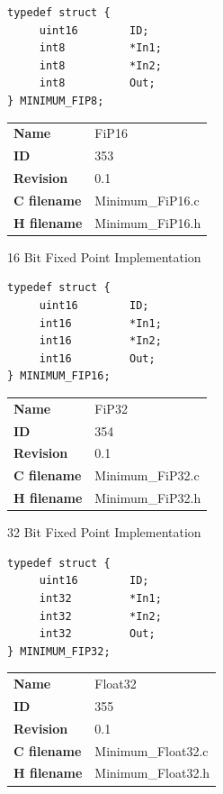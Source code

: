 \begin{lstlisting}
typedef struct {
     uint16        ID;
     int8          *In1;
     int8          *In2;
     int8          Out;
} MINIMUM_FIP8;
\end{lstlisting}

\ifdefined \AddTestReports
{}
\fi
{}
\nopagebreak[0]
\begin{tabular}{l l}
\textbf{Name} & FiP16 \tabularnewline
\textbf{ID} & 353 \tabularnewline
\textbf{Revision} & 0.1 \tabularnewline
\textbf{C filename} & Minimum\_FiP16.c \tabularnewline
\textbf{H filename} & Minimum\_FiP16.h \tabularnewline
\end{tabular}
\vspace{1ex}

16 Bit Fixed Point Implementation

\begin{lstlisting}
typedef struct {
     uint16        ID;
     int16         *In1;
     int16         *In2;
     int16         Out;
} MINIMUM_FIP16;
\end{lstlisting}

\ifdefined \AddTestReports
{}
\fi
{}
\nopagebreak[0]
\begin{tabular}{l l}
\textbf{Name} & FiP32 \tabularnewline
\textbf{ID} & 354 \tabularnewline
\textbf{Revision} & 0.1 \tabularnewline
\textbf{C filename} & Minimum\_FiP32.c \tabularnewline
\textbf{H filename} & Minimum\_FiP32.h \tabularnewline
\end{tabular}
\vspace{1ex}

32 Bit Fixed Point Implementation

\begin{lstlisting}
typedef struct {
     uint16        ID;
     int32         *In1;
     int32         *In2;
     int32         Out;
} MINIMUM_FIP32;
\end{lstlisting}

\ifdefined \AddTestReports
{}
\fi
{}
\nopagebreak[0]
\begin{tabular}{l l}
\textbf{Name} & Float32 \tabularnewline
\textbf{ID} & 355 \tabularnewline
\textbf{Revision} & 0.1 \tabularnewline
\textbf{C filename} & Minimum\_Float32.c \tabularnewline
\textbf{H filename} & Minimum\_Float32.h \tabularnewline
\end{tabular}
\vspace{1ex}

